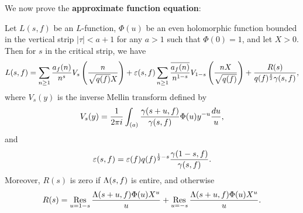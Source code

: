     We now prove the \textbf{approximate function equation}:

    \begin{theorem*}
      Let $L(s,f)$ be an $L$-function, $\Phi(u)$ be an even holomorphic function bounded in the vertical strip $|\tau| < a+1$ for any $a > 1$ such that $\Phi(0) = 1$, and let $X > 0$. Then for $s$ in the critical strip, we have
      \[
        L(s,f) = \sum_{n \ge 1}\frac{a_{f}(n)}{n^{s}}V_{s}\left(\frac{n}{\sqrt{q(f)}X}\right)+\varepsilon(s,f)\sum_{n \ge 1}\frac{\overline{a_{f}(n)}}{n^{1-s}}V_{1-s}\left(\frac{nX}{\sqrt{q(f)}}\right)+\frac{R(s)}{q(f)^{\frac{s}{2}}\gamma(s,f)},
      \]
      where $V_{s}(y)$ is the inverse Mellin transform defined by
      \[
        V_{s}(y) = \frac{1}{2\pi i}\int_{(a)}\frac{\gamma(s+u,f)}{\gamma(s,f)}\Phi(u)y^{-u}\frac{du}{u},
      \]
      and
      \[
        \varepsilon(s,f) = \varepsilon(f)q(f)^{\frac{1}{2}-s}\frac{\gamma(1-s,f)}{\gamma(s,f)}.
      \]
      Moreover, $R(s)$ is zero if $\Lambda(s,f)$ is entire, and otherwise
      \[
        R(s) = \operatorname*{\mathrm{Res}}_{u = 1-s}\frac{\Lambda(s+u,f)\Phi(u)X^{u}}{u}+\operatorname*{\mathrm{Res}}_{u = -s}\frac{\Lambda(s+u,f)\Phi(u)X^{u}}{u}.
      \]
    \end{theorem*}
